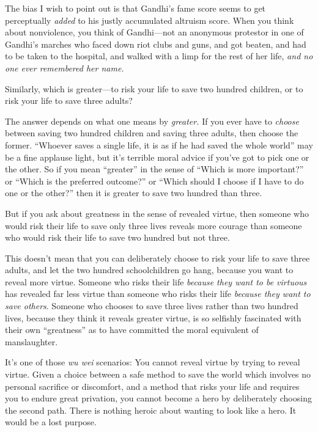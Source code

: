 {
 The bias I wish to point out is that Gandhi's fame
score seems to get perceptually \textit{added} to his justly
accumulated altruism score. When you think about nonviolence, you think
of Gandhi---not an anonymous protestor in one of
Gandhi's marches who faced down riot clubs and guns,
and got beaten, and had to be taken to the hospital, and walked with a
limp for the rest of her life, \textit{and no one ever remembered her
name.}}

{
 Similarly, which is greater---to risk your life to save two
hundred children, or to risk your life to save three adults?}

{
 The answer depends on what one means by \textit{greater.} If you
ever have to \textit{choose} between saving two hundred children and
saving three adults, then choose the former. ``Whoever
saves a single life, it is as if he had saved the whole
world'' may be a fine applause light, but
it's terrible moral advice if you've
got to pick one or the other. So if you mean
``greater'' in the sense of
``Which is more important?'' or
``Which is the preferred outcome?''
or ``Which should I choose if I have to do one or the
other?'' then it is greater to save two hundred than
three.}

{
 But if you ask about greatness in the sense of revealed virtue,
then someone who would risk their life to save only three lives reveals
more courage than someone who would risk their life to save two hundred
but not three.}

{
 This doesn't mean that you can deliberately choose
to risk your life to save three adults, and let the two hundred
schoolchildren go hang, because you want to reveal more virtue. Someone
who risks their life \textit{because they want to be virtuous} has
revealed far less virtue than someone who risks their life
\textit{because they want to save others}. Someone who chooses to save
three lives rather than two hundred lives, because they think it
reveals greater virtue, is so selfishly fascinated with their own
``greatness'' as to have committed
the moral equivalent of manslaughter.}

{
 It's one of those \textit{wu wei} scenarios: You
cannot reveal virtue by trying to reveal virtue. Given a choice between
a safe method to save the world which involves no personal sacrifice or
discomfort, and a method that risks your life and requires you to
endure great privation, you cannot become a hero by deliberately
choosing the second path. There is nothing heroic about wanting to look
like a hero. It would be a lost purpose.}

